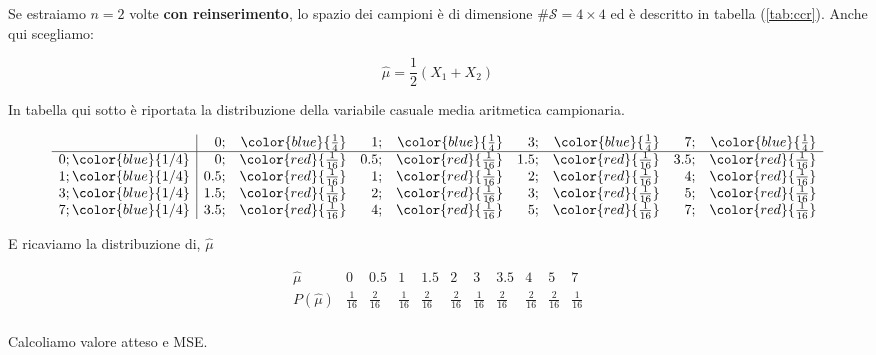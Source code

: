 \documentclass[
  11pt,
]{book}
\theoremstyle{mytheoremstyle}
\theoremstyle{mydefstyle}
\begin{document}
Se estraiamo \(n=2\) volte \textbf{con reinserimento}, lo spazio dei campioni è di dimensione \(\#\mathcal{S} = 4 \times 4\) ed è descritto in tabella (\ref{tab:ccr}). Anche qui scegliamo:

\[
\hat\mu = \frac{1}{2}(X_1 + X_2)
\]

In tabella qui sotto è riportata la distribuzione della variabile casuale media aritmetica campionaria.

\[
\begin{array}{ r|rrrrrrrr }
& 0 ;&\color{blue}{ \frac{ 1 } { 4 }} & 1 ;&\color{blue}{ \frac{ 1 } { 4 }} & 3 ;&\color{blue}{ \frac{ 1 } { 4 }} & 7 ;&\color{blue}{ \frac{ 1 } { 4 }} \\ 
\hline 
0 ;\color{blue}{ 1 / 4 }& 0;&\color{red}{\frac{1}{16}}& 0.5;&\color{red}{\frac{1}{16}}& 1.5;&\color{red}{\frac{1}{16}}& 3.5;&\color{red}{\frac{1}{16}}\\ 
1 ;\color{blue}{ 1 / 4 }& 0.5;&\color{red}{\frac{1}{16}}& 1;&\color{red}{\frac{1}{16}}& 2;&\color{red}{\frac{1}{16}}& 4;&\color{red}{\frac{1}{16}}\\ 
3 ;\color{blue}{ 1 / 4 }& 1.5;&\color{red}{\frac{1}{16}}& 2;&\color{red}{\frac{1}{16}}& 3;&\color{red}{\frac{1}{16}}& 5;&\color{red}{\frac{1}{16}}\\ 
7 ;\color{blue}{ 1 / 4 }& 3.5;&\color{red}{\frac{1}{16}}& 4;&\color{red}{\frac{1}{16}}& 5;&\color{red}{\frac{1}{16}}& 7;&\color{red}{\frac{1}{16}}\\ 
\end{array}
\]

E ricaviamo la distribuzione di, \(\hat\mu\)

\[
     \begin{array}{ r|rrrrrrrrrr }
 \hat\mu  & 0& 0.5& 1& 1.5& 2& 3& 3.5& 4& 5& 7 \\ 
 \hline 
 P( \hat\mu ) & \frac{1}{16}& \frac{2}{16}& \frac{1}{16}& \frac{2}{16}& \frac{2}{16}& \frac{1}{16}& \frac{2}{16}& \frac{2}{16}& \frac{2}{16}& \frac{1}{16} \\ 
 \end{array}
\]

Calcoliamo valore atteso e MSE.
\end{document}

